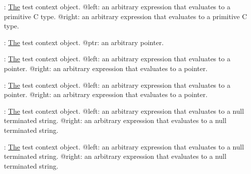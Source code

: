 \begin{DoxyRefList}
%
\+: \mbox{\hyperlink{classThe}{The}} test context object. @left\+: an arbitrary expression that evaluates to a primitive C type. @right\+: an arbitrary expression that evaluates to a primitive C type. 
\item[Member \mbox{\hyperlink{test_8h_ad08c47ed5391740f8ed97c92b8f7c7d6}{K\+U\+N\+I\+T\+\_\+\+A\+S\+S\+E\+R\+T\+\_\+\+N\+O\+T\+\_\+\+E\+R\+R\+\_\+\+O\+R\+\_\+\+N\+U\+LL}} (test, ptr)]\label{test__test000065}%
%
\+: \mbox{\hyperlink{classThe}{The}} test context object. @ptr\+: an arbitrary pointer. 
\item[Member \mbox{\hyperlink{test_8h_a83f3a4fe596b62d79a8e36e95a62d844}{K\+U\+N\+I\+T\+\_\+\+A\+S\+S\+E\+R\+T\+\_\+\+P\+T\+R\+\_\+\+EQ}} (test, left, right)]\label{test__test000055}%
%
\+: \mbox{\hyperlink{classThe}{The}} test context object. @left\+: an arbitrary expression that evaluates to a pointer. @right\+: an arbitrary expression that evaluates to a pointer. 
\item[Member \mbox{\hyperlink{test_8h_a9b1d5bad155d7f43ca77430fd314be8e}{K\+U\+N\+I\+T\+\_\+\+A\+S\+S\+E\+R\+T\+\_\+\+P\+T\+R\+\_\+\+NE}} (test, left, right)]\label{test__test000057}%
%
\+: \mbox{\hyperlink{classThe}{The}} test context object. @left\+: an arbitrary expression that evaluates to a pointer. @right\+: an arbitrary expression that evaluates to a pointer. 
\item[Member \mbox{\hyperlink{test_8h_af53540ad9d0227042cbd4d521eeef0dd}{K\+U\+N\+I\+T\+\_\+\+A\+S\+S\+E\+R\+T\+\_\+\+S\+T\+R\+EQ}} (test, left, right)]\label{test__test000062}%
%
\+: \mbox{\hyperlink{classThe}{The}} test context object. @left\+: an arbitrary expression that evaluates to a null terminated string. @right\+: an arbitrary expression that evaluates to a null terminated string. 
\item[Member \mbox{\hyperlink{test_8h_a3d53082bb79472d937ff681a7c4c5133}{K\+U\+N\+I\+T\+\_\+\+A\+S\+S\+E\+R\+T\+\_\+\+S\+T\+R\+N\+EQ}} (test, left, right)]\label{test__test000063}%
%
\+: \mbox{\hyperlink{classThe}{The}} test context object. @left\+: an arbitrary expression that evaluates to a null terminated string. @right\+: an arbitrary expression that evaluates to a null terminated string.


\end{DoxyRefList}
